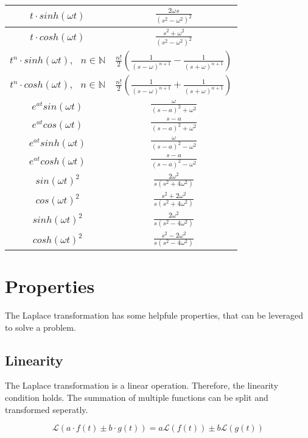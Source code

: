\documentclass[./\jobname.tex]{subfiles}
\begin{document}
\begin{table}[H]
{\begin{tabular}{|c|c|}
			$t \cdot sinh(\omega t)$ & $\frac{2 \omega s}{(s^2 - \omega^2)^2}$ \\ \hline
			$t \cdot cosh(\omega t)$ & $\frac{s^2 + \omega^2}{(s^2 - \omega^2)^2}$ \\ \hline
			$t^n \cdot sinh(\omega t), \text{ } n \in \mathbb{N}$ & $ \frac{n!}{2} \left( \frac{1}{(s - \omega)^{n + 1}} - \frac{1}{(s + \omega)^{n+1}} \right)$ \\ \hline
			$t^n \cdot cosh(\omega t), \text{ } n \in \mathbb{N}$ & $ \frac{n!}{2} \left( \frac{1}{(s - \omega)^{n + 1}} + \frac{1}{(s + \omega)^{n+1}} \right)$ \\ \hline
			$e^{at} sin(\omega t)$ & $\frac{\omega}{(s - a)^2 + \omega^2}$ \\ \hline
			$e^{at} cos(\omega t)$ & $\frac{s - a}{(s - a)^2 + \omega^2}$ \\ \hline
			$e^{at} sinh(\omega t)$ & $\frac{\omega}{(s - a)^2 - \omega^2}$ \\ \hline
			$e^{at} cosh(\omega t)$ & $\frac{s - a}{(s - a)^2 - \omega^2}$ \\ \hline
			$sin(\omega t)^2$ & $\frac{2 \omega^2}{s(s^2 + 4\omega^2)}$ \\ \hline
			$cos(\omega t)^2$ & $\frac{s^2 + 2\omega^2}{s(s^2 + 4\omega^2)}$ \\ \hline
			$sinh(\omega t)^2$ & $\frac{2 \omega^2}{s(s^2 - 4\omega^2)}$ \\ \hline
			$cosh(\omega t)^2$ & $\frac{s^2 - 2\omega^2}{s(s^2 - 4\omega^2)}$ \\ \hline
		\end{tabular}
	}
\end{table}

\newpage

\section{Properties}

The Laplace transformation has some helpfule properties, that can be leveraged to solve a problem. 

\subsection{Linearity}

The Laplace transformation is a linear operation. Therefore, the linearity condition holds. The summation of multiple functions can be split and transformed seperatly. 

\begin{equation}
	\mathcal{L} \left(a \cdot f(t) \pm b \cdot g(t)\right) = a \mathcal{L} \left( f(t) \right) \pm b \mathcal{L} \left( g(t) \right)
\end{equation}
\end{document}
